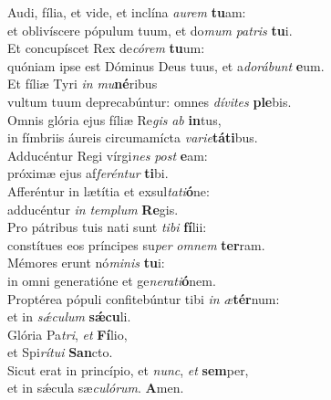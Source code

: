 \evenverse Audi, fília, et vide, et inclína \textit{au}\textit{rem} \textbf{tu}am:~\*\\
\evenverse et oblivíscere pópulum tuum, et do\textit{mum} \textit{pa}\textit{tris} \textbf{tu}i.\\
\oddverse Et concupíscet Rex de\textit{có}\textit{rem} \textbf{tu}um:~\*\\
\oddverse quóniam ipse est Dóminus Deus tuus, et a\textit{do}\textit{rá}\textit{bunt} \textbf{e}um.\\
\evenverse Et fíliæ Tyri \textit{in} \textit{mu}\textbf{né}ribus~\*\\
\evenverse vultum tuum deprecabúntur: omnes \textit{dí}\textit{vi}\textit{tes} \textbf{ple}bis.\\
\oddverse Omnis glória ejus fíliæ Re\textit{gis} \textit{ab} \textbf{in}tus,~\*\\
\oddverse in fímbriis áureis circumamícta \textit{va}\textit{ri}\textit{e}\textbf{tá}\textbf{ti}bus.\\
\evenverse Adducéntur Regi vírgi\textit{nes} \textit{post} \textbf{e}am:~\*\\
\evenverse próximæ ejus af\textit{fe}\textit{rén}\textit{tur} \textbf{ti}bi.\\
\oddverse Afferéntur in lætítia et exsul\textit{ta}\textit{ti}\textbf{ó}ne:~\*\\
\oddverse adducéntur \textit{in} \textit{tem}\textit{plum} \textbf{Re}gis.\\
\evenverse Pro pátribus tuis nati sunt \textit{ti}\textit{bi} \textbf{fí}lii:~\*\\
\evenverse constítues eos príncipes su\textit{per} \textit{om}\textit{nem} \textbf{ter}ram.\\
\oddverse Mémores erunt nó\textit{mi}\textit{nis} \textbf{tu}i:~\*\\
\oddverse in omni generatióne et ge\textit{ne}\textit{ra}\textit{ti}\textbf{ó}nem.\\
\evenverse Proptérea pópuli confitebúntur tibi \textit{in} \textit{æ}\textbf{tér}num:~\*\\
\evenverse et in \textit{sǽ}\textit{cu}\textit{lum} \textbf{sǽ}\textbf{cu}li.\\
\oddverse Glória Pa\textit{tri}, \textit{et} \textbf{Fí}lio,~\*\\
\oddverse et Spi\textit{rí}\textit{tu}\textit{i} \textbf{San}cto.\\
\evenverse Sicut erat in princípio, et \textit{nunc}, \textit{et} \textbf{sem}per,~\*\\
\evenverse et in sǽcula sæ\textit{cu}\textit{ló}\textit{rum}. \textbf{A}men.\\
